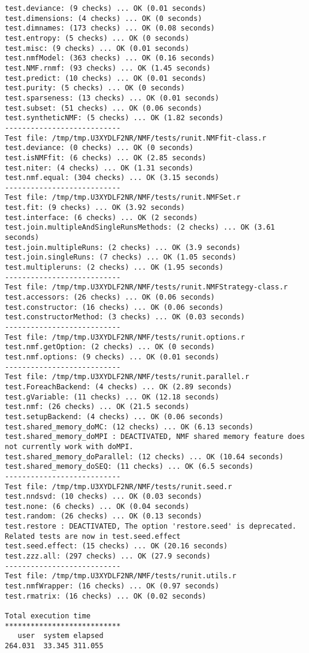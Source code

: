 \documentclass[10pt]{article}
\begin{document}
\begin{verbatim}
test.deviance: (9 checks) ... OK (0.01 seconds)
test.dimensions: (4 checks) ... OK (0 seconds)
test.dimnames: (173 checks) ... OK (0.08 seconds)
test.entropy: (5 checks) ... OK (0 seconds)
test.misc: (9 checks) ... OK (0.01 seconds)
test.nmfModel: (363 checks) ... OK (0.16 seconds)
test.NMF.rnmf: (93 checks) ... OK (1.45 seconds)
test.predict: (10 checks) ... OK (0.01 seconds)
test.purity: (5 checks) ... OK (0 seconds)
test.sparseness: (13 checks) ... OK (0.01 seconds)
test.subset: (51 checks) ... OK (0.06 seconds)
test.syntheticNMF: (5 checks) ... OK (1.82 seconds)
--------------------------- 
Test file: /tmp/tmp.U3XYDLF2NR/NMF/tests/runit.NMFfit-class.r 
test.deviance: (0 checks) ... OK (0 seconds)
test.isNMFfit: (6 checks) ... OK (2.85 seconds)
test.niter: (4 checks) ... OK (1.31 seconds)
test.nmf.equal: (304 checks) ... OK (3.15 seconds)
--------------------------- 
Test file: /tmp/tmp.U3XYDLF2NR/NMF/tests/runit.NMFSet.r 
test.fit: (9 checks) ... OK (3.92 seconds)
test.interface: (6 checks) ... OK (2 seconds)
test.join.multipleAndSingleRunsMethods: (2 checks) ... OK (3.61 seconds)
test.join.multipleRuns: (2 checks) ... OK (3.9 seconds)
test.join.singleRuns: (7 checks) ... OK (1.05 seconds)
test.multipleruns: (2 checks) ... OK (1.95 seconds)
--------------------------- 
Test file: /tmp/tmp.U3XYDLF2NR/NMF/tests/runit.NMFStrategy-class.r 
test.accessors: (26 checks) ... OK (0.06 seconds)
test.constructor: (16 checks) ... OK (0.06 seconds)
test.constructorMethod: (3 checks) ... OK (0.03 seconds)
--------------------------- 
Test file: /tmp/tmp.U3XYDLF2NR/NMF/tests/runit.options.r 
test.nmf.getOption: (2 checks) ... OK (0 seconds)
test.nmf.options: (9 checks) ... OK (0.01 seconds)
--------------------------- 
Test file: /tmp/tmp.U3XYDLF2NR/NMF/tests/runit.parallel.r 
test.ForeachBackend: (4 checks) ... OK (2.89 seconds)
test.gVariable: (11 checks) ... OK (12.18 seconds)
test.nmf: (26 checks) ... OK (21.5 seconds)
test.setupBackend: (4 checks) ... OK (0.06 seconds)
test.shared_memory_doMC: (12 checks) ... OK (6.13 seconds)
test.shared_memory_doMPI : DEACTIVATED, NMF shared memory feature does not currently work with doMPI.
test.shared_memory_doParallel: (12 checks) ... OK (10.64 seconds)
test.shared_memory_doSEQ: (11 checks) ... OK (6.5 seconds)
--------------------------- 
Test file: /tmp/tmp.U3XYDLF2NR/NMF/tests/runit.seed.r 
test.nndsvd: (10 checks) ... OK (0.03 seconds)
test.none: (6 checks) ... OK (0.04 seconds)
test.random: (26 checks) ... OK (0.13 seconds)
test.restore : DEACTIVATED, The option 'restore.seed' is deprecated. Related tests are now in test.seed.effect
test.seed.effect: (15 checks) ... OK (20.16 seconds)
test.zzz.all: (297 checks) ... OK (27.9 seconds)
--------------------------- 
Test file: /tmp/tmp.U3XYDLF2NR/NMF/tests/runit.utils.r 
test.nmfWrapper: (16 checks) ... OK (0.97 seconds)
test.rmatrix: (16 checks) ... OK (0.02 seconds)

Total execution time
***************************
   user  system elapsed 
264.031  33.345 311.055 

\end{verbatim}
\end{document}
